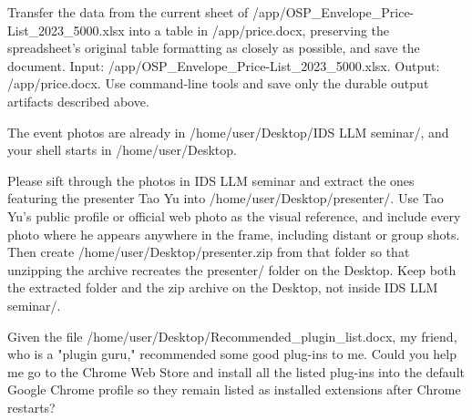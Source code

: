 \documentclass{llmxive}
\begin{document}
\begin{instructionbox}
Transfer the data from the current sheet of \textasciigrave{}/app/OSP\_Envelope\_Price-List\_2023\_5000.xlsx\textasciigrave{} into a table in \textasciigrave{}/app/price.docx\textasciigrave{}, preserving the spreadsheet's original table formatting as closely as possible, and save the document.
Input: \textasciigrave{}/app/OSP\_Envelope\_Price-List\_2023\_5000.xlsx\textasciigrave{}.
Output: \textasciigrave{}/app/price.docx\textasciigrave{}.
Use command-line tools and save only the durable output artifacts described above.
\end{instructionbox}

\begin{instructionbox}
The event photos are already in \textasciigrave{}/home/user/Desktop/IDS LLM seminar/\textasciigrave{}, and your shell starts in \textasciigrave{}/home/user/Desktop\textasciigrave{}.

Please sift through the photos in \textasciigrave{}IDS LLM seminar\textasciigrave{} and extract the ones featuring the presenter Tao Yu into \textasciigrave{}/home/user/Desktop/presenter/\textasciigrave{}. Use Tao Yu's public profile or official web photo as the visual reference, and include every photo where he appears anywhere in the frame, including distant or group shots. Then create \textasciigrave{}/home/user/Desktop/presenter.zip\textasciigrave{} from that folder so that unzipping the archive recreates the \textasciigrave{}presenter/\textasciigrave{} folder on the Desktop. Keep both the extracted folder and the zip archive on the Desktop, not inside \textasciigrave{}IDS LLM seminar/\textasciigrave{}.
\end{instructionbox}

\begin{instructionbox}
Given the file \textasciigrave{}/home/user/Desktop/Recommended\_plugin\_list.docx\textasciigrave{}, my friend, who is a "plugin guru," recommended some good plug-ins to me. Could you help me go to the Chrome Web Store and install all the listed plug-ins into the default Google Chrome profile so they remain listed as installed extensions after Chrome restarts?
\end{instructionbox}
\end{document}
